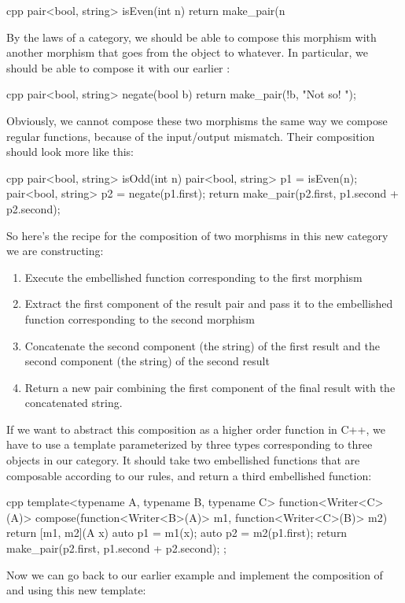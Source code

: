\begin{snip}{cpp}
pair<bool, string> isEven(int n) {
    return make_pair(n %
}
\end{snip}
By the laws of a category, we should be able to compose this morphism
with another morphism that goes from the object  to
whatever. In particular, we should be able to compose it with our
earlier :

\begin{snip}{cpp}
pair<bool, string> negate(bool b) {
    return make_pair(!b, "Not so! ");
}
\end{snip}
Obviously, we cannot compose these two morphisms the same way we compose
regular functions, because of the input/output mismatch. Their
composition should look more like this:

\begin{snip}{cpp}
pair<bool, string> isOdd(int n) {
    pair<bool, string> p1 = isEven(n);
    pair<bool, string> p2 = negate(p1.first);
    return make_pair(p2.first, p1.second + p2.second);
}
\end{snip}
So here's the recipe for the composition of two morphisms in this new
category we are constructing:

\begin{enumerate}
  \tightlist
  \item
        Execute the embellished function corresponding to the first morphism
  \item
        Extract the first component of the result pair and pass it to the
        embellished function corresponding to the second morphism
  \item
        Concatenate the second component (the string) of the first result
        and the second component (the string) of the second result
  \item
        Return a new pair combining the first component of the final result
        with the concatenated string.
\end{enumerate}

If we want to abstract this composition as a higher order function in
C++, we have to use a template parameterized by three types
corresponding to three objects in our category. It should take two
embellished functions that are composable according to our rules, and
return a third embellished function:

\begin{snip}{cpp}
template<typename A, typename B, typename C>
function<Writer<C>(A)> compose(function<Writer<B>(A)> m1,
                               function<Writer<C>(B)> m2)
{
    return [m1, m2](A x) {
        auto p1 = m1(x);
        auto p2 = m2(p1.first);
        return make_pair(p2.first, p1.second + p2.second);
    };
}
\end{snip}
Now we can go back to our earlier example and implement the composition
of  and  using this new template:

